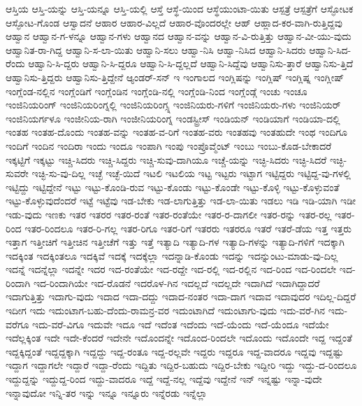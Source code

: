{ಆಸ್ತಿಯ
ಆಸ್ತಿ-ಯನ್ನು
ಆಸ್ತಿ-ಯನ್ನೂ
ಆಸ್ತಿ-ಯಲ್ಲಿ
ಆಸ್ತೆ
ಆಸ್ಥೆ-ಯಿಂದ
ಆಸ್ಥೆಯುಂಟಾ-ಯಿತು
ಆಸ್ಪತ್ರೆ
ಆಸ್ಪತ್ರೆಗೆ
ಆಸ್ಫೋಟಕ
ಆಸ್ಫೋಟ-ಗೊಂಡ
ಆಸ್ವಾದನೆ
ಆಹಾರ
ಆಹಾರ-ವಿಲ್ಲದೆ
ಆಹಾರ-ವೊಂದರಲ್ಲೇ
ಆಹ್
ಆಹ್ಲಾದ-ಕರ-ವಾಗಿ-ರುತ್ತಿದ್ದವು
ಆಹ್ವಾನ
ಆಹ್ವಾನ-ಗ-ಳನ್ನೂ
ಆಹ್ವಾನ-ಗಳು
ಆಹ್ವಾನದ
ಆಹ್ವಾನ-ವನ್ನು
ಆಹ್ವಾನ-ವಿ-ರುತ್ತಿತ್ತು
ಆಹ್ವಾನ-ವೀ-ಯು-ವುದು
ಆಹ್ವಾನಿತ-ರಾ-ಗಿದ್ದ
ಆಹ್ವಾನಿ-ಸ-ಲಾ-ಯಿತು
ಆಹ್ವಾನಿ-ಸಲು
ಆಹ್ವಾ-ನಿಸಿ
ಆಹ್ವಾ-ನಿಸಿದ
ಆಹ್ವಾನಿ-ಸಿದರು
ಆಹ್ವಾನಿ-ಸಿದ-ರೆಂದು
ಆಹ್ವಾನಿ-ಸಿ-ದ್ದರು
ಆಹ್ವಾನಿ-ಸಿ-ದ್ದರೂ
ಆಹ್ವಾನಿ-ಸಿ-ದ್ದಲ್ಲದೆ
ಆಹ್ವಾನಿ-ಸಿದ್ದೆವು
ಆಹ್ವಾನಿಸು-ತ್ತಾರೆ
ಆಹ್ವಾನಿಸು-ತ್ತಿದೆ
ಆಹ್ವಾನಿಸು-ತ್ತಿದ್ದರು
ಆಹ್ವಾನಿಸು-ತ್ತಿದ್ದೇನೆ
ಆ್ಯಂಡರ್-ಸನ್
ಇ
ಇಂಗಾಲದ
ಇಂಗ್ಲಿಷನ್ನು
ಇಂಗ್ಲಿಷ್
ಇಂಗ್ಲಿಷ್ನ
ಇಂಗ್ಲೀಷ್
ಇಂಗ್ಲೆಂಡ-ನಲ್ಲಿನ
ಇಂಗ್ಲೆಂಡಿಗೆ
ಇಂಗ್ಲೆಂಡಿನ
ಇಂಗ್ಲೆಂಡಿ-ನಲ್ಲಿ
ಇಂಗ್ಲೆಂಡಿ-ನಿಂದ
ಇಂಗ್ಲೆಂಡ್ಗೆ
ಇಂಚು
ಇಂಚೂ
ಇಂಜಿನಿಯರಿಂಗ್
ಇಂಜಿನಿಯರಿಂಗ್ನಲ್ಲಿ
ಇಂಜಿನಿಯರಿಂಗ್ಸ್ನ
ಇಂಜಿನಿಯರು-ಗಳಿಗೆ
ಇಂಜಿನಿಯರು-ಗಳು
ಇಂಜಿನಿಯರ್
ಇಂಜಿನಿಯರ್ಗಳೂ
ಇಂಜೀನಿಯ-ರಾಗಿ
ಇಂಜೀನಿಯರಿಂಗ್ನ
ಇಂಡಸ್ಟ್ರೀಸ್
ಇಂಡಿಯನ್
ಇಂಡಿಯಾಗೆ
ಇಂಡಿಯಾ-ದಲ್ಲಿ
ಇಂತಹ
ಇಂತಹ-ದೊಂದು
ಇಂತಹ-ವನ್ನು
ಇಂತಹ-ವ-ರಿಗೆ
ಇಂತಹ-ವರು
ಇಂತಹವು
ಇಂತಹುದೇ
ಇಂಥ
ಇಂದಿಗೂ
ಇಂದಿಗೆ
ಇಂದಿನ
ಇಂದಿರಾ
ಇಂದು
ಇಂದೂ
ಇಂಪಾಗಿ
ಇಂಪು
ಇಂಪ್ರೊವ್ಮೆಂಟ್
ಇಂಬು
ಇಂಬು-ಕೊಡ-ಬೇಕಾದರೆ
ಇಕ್ಕಟ್ಟಿಗೆ
ಇಕ್ಕಟ್ಟು
ಇಚ್ಚಿ-ಸಿದರು
ಇಚ್ಚಿ-ಸಿದ್ದರು
ಇಚ್ಚಿ-ಸುವು-ದಾಗಿಯೂ
ಇಚ್ಚೆ-ಯನ್ನು
ಇಚ್ಛಿ-ಸಿದರು
ಇಚ್ಛಿ-ಸಿದರೆ
ಇಚ್ಛಿ-ಸುವರೇ
ಇಚ್ಛಿ-ಸು-ವು-ದಿಲ್ಲ
ಇಚ್ಛೆ
ಇಚ್ಛೆ-ಯಿದೆ
ಇಟಲಿ
ಇಟಲಿಯ
ಇಟ್ಟ
ಇಟ್ಟರು
ಇಟ್ಟಾಗ
ಇಟ್ಟಿದ್ದರು
ಇಟ್ಟಿದ್ದ-ವು-ಗಳಲ್ಲಿ
ಇಟ್ಟಿದ್ದು
ಇಟ್ಟಿದ್ದೇನೆ
ಇಟ್ಟು
ಇಟ್ಟು-ಕೊಂಡಿ-ರುವ
ಇಟ್ಟು-ಕೊಂಡು
ಇಟ್ಟು-ಕೊಂಡೇ
ಇಟ್ಟು-ಕೊಳ್ಳಿ
ಇಟ್ಟು-ಕೊಳ್ಳುವಂತೆ
ಇಟ್ಟು-ಕೊಳ್ಳುವುದೆಂದರೆ
ಇಟ್ಟೆ
ಇಟ್ಟೆವು
ಇಡ-ಬೇಕು
ಇಡ-ಲಾಗುತ್ತಿತ್ತು
ಇಡ-ಲಾ-ಯಿತು
ಇಡಲು
ಇಡಿ
ಇಡಿ-ಯಾಗಿ
ಇಡೀ
ಇಡು-ವುದು
ಇಣಕು
ಇತರ
ಇತರರ
ಇತರ-ರಂತೆ
ಇತರ-ರಂತೆಯೇ
ಇತರ-ರ-ದಾಗಲೀ
ಇತರ-ರನ್ನು
ಇತರ-ರಲ್ಲ
ಇತರ-ರಿಂದ
ಇತರ-ರಿಂದಲೂ
ಇತರ-ರಿ-ಗಲ್ಲ
ಇತರ-ರಿಗೂ
ಇತರ-ರಿಗೆ
ಇತರರು
ಇತರರೂ
ಇತರೆ
ಇತರೆ-ಡೆಯ
ಇತ್ತ
ಇತ್ತರು
ಇತ್ತಾಗ
ಇತ್ತೀಚಿಗೆ
ಇತ್ತೀಚಿನ
ಇತ್ತೀಚೆಗೆ
ಇತ್ತು
ಇತ್ತೆ
ಇತ್ಯಾದಿ
ಇತ್ಯಾದಿ-ಗಳ
ಇತ್ಯಾದಿ-ಗಳನ್ನು
ಇತ್ಯಾದಿ-ಗಳಿಗೆ
ಇದಕ್ಕಾಗಿ
ಇದಕ್ಕಿಂತ
ಇದಕ್ಕಿಂತಲೂ
ಇದಕ್ಕಿವೆ
ಇದಕ್ಕೆ
ಇದಕ್ಕೆಲ್ಲಾ
ಇದನ್ನಾಡಿ-ಕೊಂಡು
ಇದನ್ನು
ಇದನ್ನುಂಟು-ಮಾಡು-ವು-ದಿಲ್ಲ
ಇದನ್ನೆ
ಇದನ್ನೆಲ್ಲಾ
ಇದನ್ನೇ
ಇದರ
ಇದ-ರಂತೆಯೇ
ಇದ-ರದ್ದೇ
ಇದ-ರಲ್ಲಿ
ಇದ-ರಲ್ಲಿನ
ಇದ-ರಿಂದ
ಇದ-ರಿಂದಲೇ
ಇದ-ರಿಂದಾಗಿ
ಇದ-ರಿಂದಾಗಿಯೇ
ಇದ-ರೊಡನೆ
ಇದರೊಳ-ಗಿನ
ಇದಲ್ಲದೆ
ಇದಲ್ಲದೇ
ಇದಾಗಿದೆ
ಇದಾಗಿದ್ದಾದರೆ
ಇದಾಗುತ್ತಿತ್ತು
ಇದಾಗು-ವುದು
ಇದಾದ
ಇದಾ-ದದ್ದು
ಇದಾದ-ನಂತರ
ಇದಾ-ದಾಗ
ಇದಾವ
ಇದಾವುದರ
ಇದಿಲ್ಲ-ದಿದ್ದರೆ
ಇದೀಗ
ಇದು
ಇದುಂಟಾಗ-ಬಹು-ದೆಂದು-ರಾಮನ್ರ-ವರ
ಇದುಂಟಾಗಿದೆ
ಇದುಂಟಾಗು-ವುದು
ಇದು-ವರೆ-ಗಿನ
ಇದು-ವರೆಗೂ
ಇದು-ವರೆ-ವಿಗೂ
ಇದುವೇ
ಇದೂ
ಇದೆ
ಇದೆಂತ
ಇದೆಂದು
ಇದೆ-ಯೆಂದು
ಇದೆ-ಯೆಂದೂ
ಇದೆಯೇ
ಇದೆಲ್ಲಕ್ಕಿಂತ
ಇದೇ
ಇದೇ-ಕೆಂದರೆ
ಇದೇನೇ
ಇದೊಂದನ್ನೇ
ಇದೊಂದ-ರಿಂದಲೇ
ಇದೊಂದು
ಇದೊಂದೇ
ಇದ್ದ
ಇದ್ದಂತೆ
ಇದ್ದಕ್ಕಿದ್ದಂತೆ
ಇದ್ದದ್ದಕ್ಕಾಗಿ
ಇದ್ದದ್ದು
ಇದ್ದ-ರಂತೂ
ಇದ್ದ-ರಲ್ಲವೇ
ಇದ್ದರು
ಇದ್ದರೂ
ಇದ್ದ-ವಾದರೂ
ಇದ್ದವು
ಇದ್ದಷ್ಟು
ಇದ್ದಾಗ
ಇದ್ದಾಗಲೇ
ಇದ್ದಾರೆ
ಇದ್ದಾ-ರೆಂದು
ಇದ್ದಿತು
ಇದ್ದಿರ-ಬಹುದು
ಇದ್ದಿರ-ಬೇಕು
ಇದ್ದೀರಿ
ಇದ್ದು
ಇದ್ದು-ದ-ರಿಂದಲೂ
ಇದ್ದುದ್ದನ್ನು
ಇದ್ದುದ್ದ-ರಿಂದ
ಇದ್ದು-ವಾದರೂ
ಇದ್ದೆ
ಇದ್ದೆ-ನಲ್ಲ
ಇದ್ದೆವು
ಇದ್ದೇನೆ
ಇನ್
ಇನ್ನಷ್ಟು
ಇನ್ನಾ-ವುದೇ
ಇನ್ನಾವುದೋ
ಇನ್ನಿ-ತರ
ಇನ್ನು
ಇನ್ನೂ
ಇನ್ನೂರು
ಇನ್ನೆರಡು
ಇನ್ನೆಲ್ಲಾ
}
